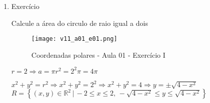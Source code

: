 \begin{enumerate}
	\item Exercício
	
	Calcule a área do circulo de raio igual a dois
	
	\begin{figure}[H]
		\centering
		\texttt{[image: v11\_a01\_e01.png]}
		\caption{Coordenadas polares - Aula 01 - Exercício I}
		\label{v11_a01_e01}
	\end{figure}
	
	$r = 2 \Rightarrow a = \pi r^2 = 2^2 \pi = 4\pi$\newline
	
	$x^2 + y^2 = r^2 \Rightarrow x^2 + y^2 = 2^2 \Rightarrow x^2 + y^2 = 4 \Rightarrow y = \pm\sqrt{4 - x^2}$\newline	
	$R = \left\{(x, y) \in \mathbb{R}^2 \,|\, -2 \leq x \leq 2,\, -\sqrt{4 - x^2} \leq y \leq \sqrt{4 - x^2} \right\}$\newline
	

\end{enumerate}
